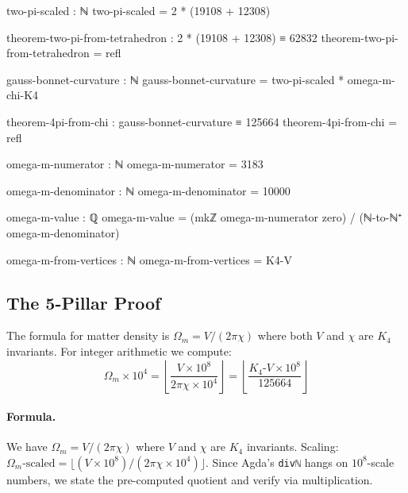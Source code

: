 \documentclass[11pt,a4paper]{book}
\begin{document}
\begin{code}
two-pi-scaled : ℕ
two-pi-scaled = 2 * (19108 + 12308)
  
theorem-two-pi-from-tetrahedron : 2 * (19108 + 12308) ≡ 62832
theorem-two-pi-from-tetrahedron = refl

gauss-bonnet-curvature : ℕ
gauss-bonnet-curvature = two-pi-scaled * omega-m-chi-K4

theorem-4pi-from-chi : gauss-bonnet-curvature ≡ 125664
theorem-4pi-from-chi = refl

omega-m-numerator : ℕ
omega-m-numerator = 3183

omega-m-denominator : ℕ
omega-m-denominator = 10000

omega-m-value : ℚ
omega-m-value = (mkℤ omega-m-numerator zero) / (ℕ-to-ℕ⁺ omega-m-denominator)

omega-m-from-vertices : ℕ
omega-m-from-vertices = K4-V
\end{code}

\subsection{The 5-Pillar Proof}

The formula for matter density is $\Omega_m = V/(2\pi\chi)$ where both $V$ and $\chi$ are
$K_4$ invariants. For integer arithmetic we compute:
\[
  \Omega_m \times 10^4 = \left\lfloor \frac{V \times 10^8}{2\pi\chi \times 10^4} \right\rfloor 
  = \left\lfloor \frac{K_4\text{-}V \times 10^8}{125664} \right\rfloor
\]

\paragraph{Formula.}
We have $\Omega_m = V / (2\pi\chi)$ where $V$ and $\chi$ are $K_4$ invariants.
Scaling: $\Omega_m\text{-scaled} = \lfloor(V \times 10^8) / (2\pi\chi \times 10^4)\rfloor$.
Since Agda's \texttt{divℕ} hangs on $10^8$-scale numbers, we state the pre-computed quotient
and verify via multiplication.
\end{document}
